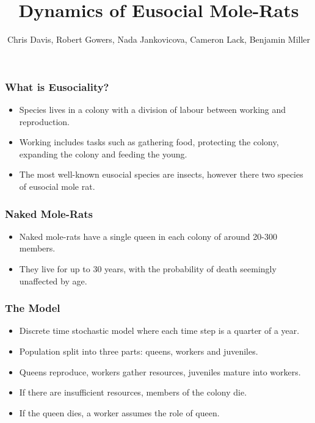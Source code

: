 \documentclass[xcolor={dvipsnames,svgnames}]{beamer}
\author{Chris Davis, Robert Gowers, Nada Jankovicova, Cameron Lack, Benjamin Miller}
\title{Dynamics of Eusocial Mole-Rats}
\begin{document}
	\begin{frame}
		\titlepage
	\end{frame}
	\begin{frame}
	\frametitle{What is Eusociality?}
	\begin{itemize}
	\item Species lives in a colony with a division of labour between working and reproduction.
	\item Working includes tasks such as gathering food, protecting the colony, expanding the colony and feeding the young.
	\item The most well-known eusocial species are insects, however there two species of eusocial mole rat.
	\end{itemize}
	
	\end{frame}
	\begin{frame}
	\frametitle{Naked Mole-Rats}
	\begin{itemize}
	\item Naked mole-rats have a single queen in each colony of around 20-300 members.
	\item They live for up to 30 years, with the probability of death seemingly unaffected by age.
	\end{itemize}
	\end{frame}
	\begin{frame}
	\frametitle{The Model}
	\begin{itemize}
	\item Discrete time stochastic model where each time step is a quarter of a year.
	\item Population split into three parts: queens, workers and juveniles.
	\item Queens reproduce, workers gather resources, juveniles mature into workers.
	\item If there are insufficient resources, members of the colony die.
	\item If the queen dies, a worker assumes the role of queen.
	\end{itemize}
	\end{frame}
	
\end{document}
